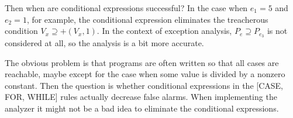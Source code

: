 \documentclass{article}
\begin{document}
Then when are conditional expressions successful? In the case when $e_{1}=5$ and $e_{2}=1$, for example, the conditional expression eliminates the treacherous condition $V_{x}\supseteq +(V_{x}, 1)$. In the context of exception analysis, $P_{e}\supseteq P_{e_{3}}$ is not considered at all, so the analysis is a bit more accurate.

The obvious problem is that programs are often written so that all cases are reachable, maybe except for the case when some value is divided by a nonzero constant. Then the question is whether conditional expressions in the [CASE, FOR, WHILE] rules actually decrease false alarms. When implementing the analyzer it might not be a bad idea to eliminate the conditional expressions.

\printbibliography
\end{document}
